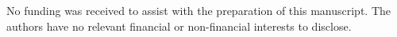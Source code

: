 \documentclass[pdflatex, sn-mathphys, referee]{sn-jnl}%
\theoremstyle{thmstyleone}%
\theoremstyle{thmstyletwo}%
\theoremstyle{thmstylethree}%
\theoremstyle{thmstyleone}
\begin{document}
No funding was received to assist with the preparation of this manuscript. The authors have no relevant financial or non-financial interests to disclose.



\end{document}
